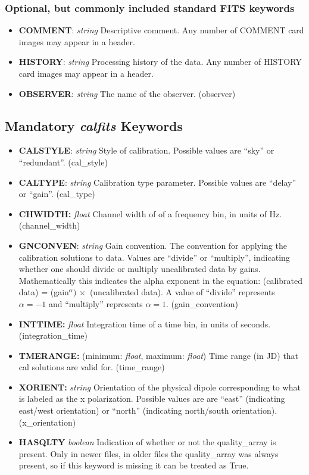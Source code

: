 \documentclass[11pt, oneside, english]{article}   	%
\begin{document}
	\subsubsection{Optional, but commonly included standard FITS keywords}
	\begin{itemize}
	\item{\textbf{COMMENT}: \emph{string} Descriptive comment. Any number of COMMENT card images may
	appear in a header.}
	\item{\textbf{HISTORY}: \emph{string} Processing history of the data. Any number of HISTORY card images may appear in a header.}
	\item{\textbf{OBSERVER}: \emph{string} The name of the observer. (observer)}
	\end{itemize}
	
	
\subsection{Mandatory \emph{calfits} Keywords}
\begin{itemize}
\item{\textbf{CALSTYLE}: \emph{string} Style of calibration. Possible values are ``sky'' or ``redundant''. (cal\_style)}
\item{\textbf{CALTYPE}: \emph{string} Calibration type parameter. Possible values are ``delay'' or ``gain''. (cal\_type)}
\item{\textbf{CHWIDTH:} \emph{float} Channel width of of a frequency bin, in units of Hz. (channel\_width)}
\item{\textbf{GNCONVEN}: \emph{string} Gain convention. The convention for applying the calibration solutions to data.
Values are ``divide'' or ``multiply'', indicating whether one should divide or multiply uncalibrated data by gains. 
Mathematically this indicates the alpha exponent in the equation: 
    (calibrated data) = (gain$^{\alpha}) \,  \times $ (uncalibrated data). A value of
    ``divide'' represents $\alpha=-1$ and ``multiply'' represents $\alpha=1$. (gain\_convention)}
\item{\textbf{INTTIME:} \emph{float} Integration time of a time bin, in units of seconds. (integration\_time)}
\item{\textbf{TMERANGE:} (minimum: \emph{float}, maximum: \emph{float}) Time range (in JD) that cal solutions are valid for. (time\_range)}
\item{\textbf{XORIENT:} \emph{string} Orientation of the physical dipole corresponding to what is labeled as the x polarization. Possible values are are ``east'' (indicating east/west orientation) or ``north'' (indicating north/south orientation). (x\_orientation)}
\item{\textbf{HASQLTY}} \emph{boolean} Indication of whether or not the quality\_array is present. Only in newer files, in older files the
quality\_array was always present, so if this keyword is missing it can be treated as True.
\end{itemize}
\end{document}
